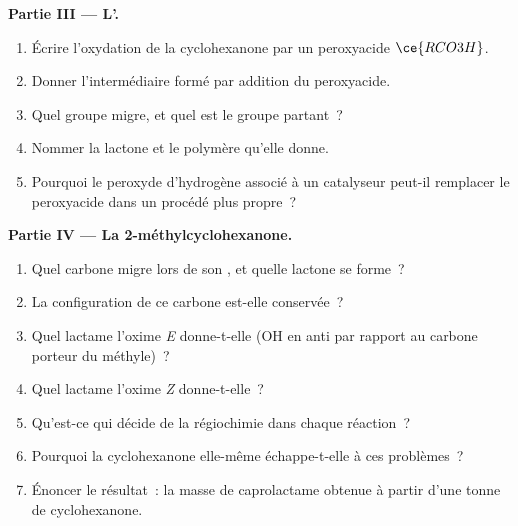 \begin{problem}
\medskip\noindent\textbf{Partie III --- L'.}
\begin{enumerate}[resume]
  \item Écrire l'oxydation de la cyclohexanone par un peroxyacide $\ce{RCO3H}$.
  \item Donner l'intermédiaire formé par addition du peroxyacide.
  \item Quel groupe migre, et quel est le groupe partant~?
  \item Nommer la lactone et le polymère qu'elle donne.
  \item Pourquoi le peroxyde d'hydrogène associé à un catalyseur peut-il
        remplacer le peroxyacide dans un procédé plus propre~?
\end{enumerate}

\medskip\noindent\textbf{Partie IV --- La 2-méthylcyclohexanone.}
\begin{enumerate}[resume]
  \item Quel carbone migre lors de son , et
        quelle lactone se forme~?
  \item La configuration de ce carbone est-elle conservée~?
  \item Quel lactame l'oxime \textit{E} donne-t-elle (OH en anti par rapport au carbone porteur du méthyle)~?
  \item Quel lactame l'oxime \textit{Z} donne-t-elle~?
  \item Qu'est-ce qui décide de la régiochimie dans chaque réaction~?
  \item Pourquoi la cyclohexanone elle-même échappe-t-elle à ces
        problèmes~?
  \item Énoncer le résultat~: la masse de caprolactame obtenue à partir
        d'une tonne de cyclohexanone.
\end{enumerate}
\end{problem}
